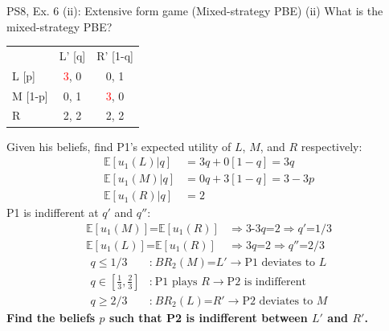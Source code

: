 \begin{frame}{PS8, Ex. 6 (ii): Extensive form game (Mixed-strategy PBE)}
    (ii) What is the mixed-strategy PBE? \vspace{-8pt}
    \begin{multicols}{2}
      \begin{table}
        \begin{tabular}{l|c|c|}
          \multicolumn{1}{c}{} & \multicolumn{1}{c}{L' [q]} & \multicolumn{1}{c}{R' [1-q]} \\\cline{2-3}
          L [p]   & \textcolor{red}{3}, 0 & 0, \color{blue}1 \\\cline{2-3}
          M [1-p] & 0, \color{blue}1 & \textcolor{red}{3}, 0 \\\cline{2-3}
          R       & 2, \color{blue}2 & 2, \color{blue}2 \\\cline{2-3}
        \end{tabular}
      \end{table} \vspace{-4pt}
      Given his beliefs, find P1's expected utility of $L$, $M$, and $R$ respectively: \vspace{-4pt}
      \begin{align*}
        \mathbb{E}[u_1(L)|q]&=3q+0[1-q]=3q\\
        \mathbb{E}[u_1(M)|q]&=0q+3[1-q]=3-3p\\
        \mathbb{E}[u_1(R)|q]&=2
      \end{align*}
      P1 is indifferent at $q'$ and $q''$: \vspace{-6pt}
      \begin{align*}
        \mathbb{E}[u_1(M)]\text{=}\mathbb{E}[u_1(R)]&\Rightarrow \text{3-3}q\text{=}2\Rightarrow q'\text{=}1/3\\
        \mathbb{E}[u_1(L)]\text{=}\mathbb{E}[u_1(R)]&\Rightarrow 3q\text{=}2\Rightarrow q''\text{=}2/3
      \end{align*} \vspace{-16pt}
      \begin{align*}
        q\leq1/3&\text{:}\ BR_2(M)\text{=}L'\rightarrow\text{P1 deviates to }L\\
        q\text{$\in$}{\textstyle\left[\frac{1}{3},\frac{2}{3}\right]}&\text{:}\ \text{P1 plays }R\rightarrow\text{P2 is indifferent}\\
        q\geq2/3&\text{:}\ BR_2(L)\text{=}R'\rightarrow\text{P2 deviates to }M
      \end{align*}
      \textbf{Find the beliefs $p$ such that P2 is indifferent between $L'$ and $R'$.}

\end{multicols}
\end{frame}
